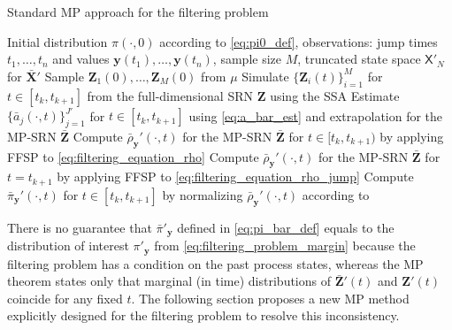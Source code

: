 \begin{algorithm}[H]
\caption{Standard \ac{MP} approach for the filtering problem}
\label{alg:MP_FFSP}
\begin{algorithmic}[1]
    \Require Initial distribution $\pi(\cdot, 0)$ according to \eqref{eq:pi0_def}, observations: jump times $t_1, \dots, t_n$ and values $\boldsymbol{y}(t_1), \dots, \boldsymbol{y}(t_n)$, sample size $M$, truncated state space $\mathsf{X}'_N$ for $\bar{\boldsymbol{X}}'$
    \State Sample $\boldsymbol{Z}_1(0), \dots, \boldsymbol{Z}_M(0)$ from $\mu$
        \State Simulate $\{\boldsymbol{Z}_i(t)\}_{i=1}^M$ for  $t \in [t_k, t_{k+1}]$ from the full-dimensional \ac{SRN} $\boldsymbol{Z}$ using the \ac{SSA}
        \State Estimate $\{\bar{a}_j (\cdot, t)\}_{j=1}^{J'}$ for $t \in [t_k, t_{k+1}]$ using \eqref{eq:a_bar_est} and extrapolation for the \ac{MP}-\ac{SRN} $\bar{\boldsymbol{Z}}$ 
        \State Compute $\bar{\rho}_{\boldsymbol{y}}'(\cdot, t)$  for the \ac{MP}-\ac{SRN} $\bar{\boldsymbol{Z}}$ for $t \in [t_k, t_{k+1})$ by applying \ac{FFSP} to \eqref{eq:filtering_equation_rho}
        \State Compute $\bar{\rho}_{\boldsymbol{y}}'(\cdot, t)$  for the \ac{MP}-\ac{SRN} $\bar{\boldsymbol{Z}}$ for $t = t_{k+1}$ by applying \ac{FFSP} to \eqref{eq:filtering_equation_rho_jump}
        \State Compute $\bar{\pi}_{\boldsymbol{y}}'(\cdot, t)$ for $t \in [t_k, t_{k+1}]$ by normalizing  $\bar{\rho}_{\boldsymbol{y}}'(\cdot, t)$ according to  \cite{DAmbrosio2022FFSP}
    \EndFor
\end{algorithmic}
\end{algorithm}

There is no guarantee that $\bar{\pi}'_{\boldsymbol{y}}$ defined in \eqref{eq:pi_bar_def} equals to the distribution of interest $\pi'_{\boldsymbol{y}}$ from \eqref{eq:filtering_problem_margin} because the filtering problem has a condition on the past process states, whereas the \ac{MP} theorem states only that marginal (in time) distributions of $\bar{\boldsymbol{Z}}'(t)$ and $\boldsymbol{Z}'(t)$ coincide for any fixed $t$. The following section proposes a new \ac{MP} method explicitly designed for the filtering problem to resolve this inconsistency.



